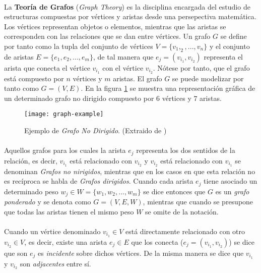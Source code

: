 \documentclass{subfiles}
\begin{document}
      \paragraph{}
      La \textbf{Teoría de Grafos} (\emph{Graph Theory}) es la disciplina encargada del estudio de estructuras compuestas por vértices y aristas desde una persepectiva matemática. Los vértices representan objetos o elementos, mientras que las aristas se corresponden con las relaciones que se dan entre vértices. Un grafo $G$ se define por tanto como la tupla del conjunto de vértices $V = \{ v_1, _2, ..., v_n \}$ y el conjunto de aristas $E = \{ e_1, e_2, ..., e_m \}$, de tal manera que $e_j = (v_{i_1}, v_{i_2})$ representa el arista que conecta el vértice $v_{i_1}$ con el vértice $v_{i_2}$. Nótese por tanto, que el grafo está compuesto por $n$ vértices y $m$ aristas. El grafo $G$ se puede modelizar por tanto como $G = (V, E)$. En la figura \ref{img:graph_example} se muestra una representación gráfica de un determinado grafo no dirigido compuesto por $6$ vértices y $7$ aristas.

      \begin{figure}
        \centering
        \texttt{[image: graph-example]}
        \caption{Ejemplo de \emph{Grafo No Dirigido}. (Extraido de \cite{wiki:Graph_(discrete_mathematics)})}
        \label{img:graph_example}
      \end{figure}

      \paragraph{}
      Aquellos grafos para los cuales la arista $e_j$ representa los dos sentidos de la relación, es decir, $v_{i_1}$ está relacionado con $v_{i_2}$ y $v_{i_2}$ está relacionado con $v_{i_1}$ se denominan \emph{Grafos no nirigidos}, mientras que en los casos en que esta relación no es recíproca se habla de \emph{Grafos dirigidos}. Cuando cada arista $e_j$ tiene asociado un determinado peso $w_j \in W =  \{ w_1, w_2, ..., w_m\}$ se dice entonces que $G$ es un \emph{grafo ponderado} y se denota como $G=(V, E, W)$, mientras que cuando se presupone que todas las aristas tienen el mismo peso $W$ se omite de la notación.

      \paragraph{}
      Cuando un vértice denominado $v_{i_1} \in V$ está directamente relacionado con otro $v_{i_2} \in V$, es decir, existe una arista $e_j \in E$ que los conecta ($e_j = (v_{i_1}, v_{i_2})$) se dice que son $e_j$ es \emph{incidente} sobre dichos vértices. De la misma manera se dice que $v_{i_1}$ y $v_{i_2}$ son \emph{adjacentes} entre sí.
\end{document}
